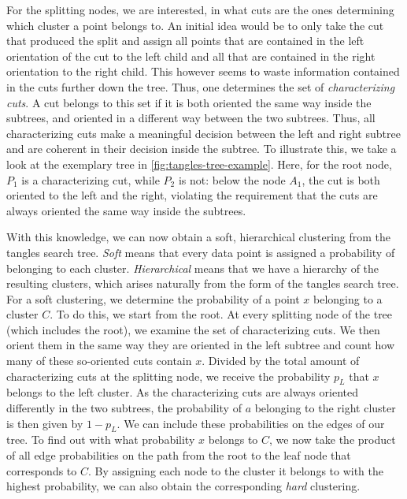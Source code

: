 For the splitting nodes, we are interested, in what cuts are the ones determining 
which cluster a point belongs to. An initial idea would be to only take the cut that produced the split
and assign all points that are contained in the left orientation of the cut to the
left child and all that are contained in the right orientation to the right child. This
however seems to waste information contained in the cuts further down the tree. 
Thus, one determines the set of \textit{characterizing cuts}.  
A cut belongs to this set if it is both oriented the same way inside the subtrees, and oriented in a different way between the two subtrees. Thus, all characterizing cuts make a meaningful decision between the left and right subtree and are coherent in their decision inside the subtree. 
To illustrate this, we take a look at the exemplary tree in \autoref{fig:tangles-tree-example}. Here, for the root node, $P_1$ is a characterizing cut,
while $P_2$ is not: below the node $A_1$, the cut is both oriented to the left and the right, violating the requirement that the cuts are always oriented
the same way inside the subtrees. 

With this knowledge, we can now obtain a soft, hierarchical clustering from the tangles search tree. 
\textit{Soft} means that every data point is assigned
a probability of belonging to each cluster. 
\textit{Hierarchical} means that we have a hierarchy of the resulting clusters, which arises naturally
from the form of the tangles search tree. 
For a soft clustering, we determine the probability of a point $x$ belonging to a cluster $C$. 
To do this, we start from the root. At every splitting node of the tree (which includes the root), we examine the set of characterizing cuts.
We then orient them in the same way they are oriented in the left subtree and count how many of these so-oriented cuts contain $x$. Divided by the total amount of characterizing cuts at the
splitting node, we receive the probability $p_L$ that $x$ belongs to the left cluster. As the characterizing cuts are always oriented differently in the two subtrees, the probability
of $a$ belonging to the right cluster is then given by $1 - p_L$. We can include these probabilities on the edges of our tree. 
To find out with what probability $x$ belongs to $C$, 
we now take the product of all edge probabilities on the path from the root to the leaf node that corresponds to $C$. 
By assigning each node to the cluster it belongs to with the highest probability, we can also obtain the corresponding \textit{hard} clustering.

